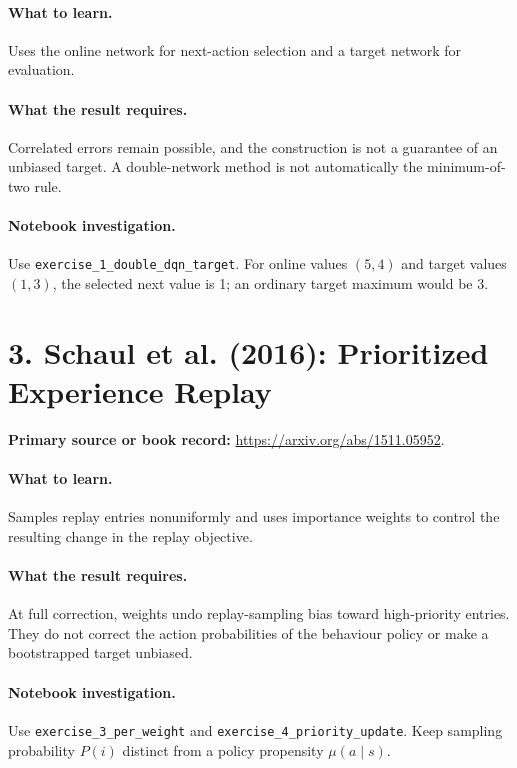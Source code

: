 \documentclass[11pt]{scrartcl}
\begin{document}
\paragraph{What to learn.} Uses the online network for next-action selection and a target network for evaluation.

\paragraph{What the result requires.} Correlated errors remain possible, and the construction is not a guarantee of an unbiased target. A double-network method is not automatically the minimum-of-two rule.

\paragraph{Notebook investigation.} Use \texttt{exercise\_1\_double\_dqn\_target}. For online values $(5,4)$ and target values $(1,3)$, the selected next value is 1; an ordinary target maximum would be 3.

\section*{3. Schaul et al. (2016): Prioritized Experience Replay}
\textbf{Primary source or book record:} \url{https://arxiv.org/abs/1511.05952}.

\paragraph{What to learn.} Samples replay entries nonuniformly and uses importance weights to control the resulting change in the replay objective.

\paragraph{What the result requires.} At full correction, weights undo replay-sampling bias toward high-priority entries. They do not correct the action probabilities of the behaviour policy or make a bootstrapped target unbiased.

\paragraph{Notebook investigation.} Use \texttt{exercise\_3\_per\_weight} and \texttt{exercise\_4\_priority\_update}. Keep sampling probability $P(i)$ distinct from a policy propensity $\mu(a\mid s)$.
\end{document}
